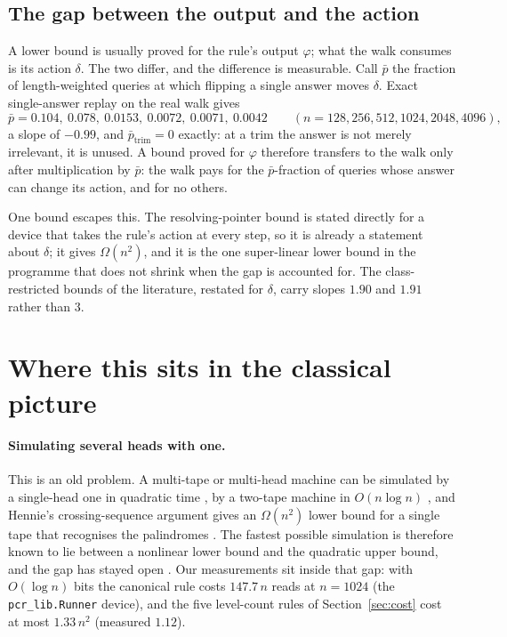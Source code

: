 \documentclass[11pt]{article}
\theoremstyle{remark}
\begin{document}
\subsection{The gap between the output and the action}\label{sec:gap}

A lower bound is usually proved for the rule's output $\varphi$; what the walk consumes is its
action $\delta$. The two differ, and the difference is measurable. Call $\bar p$ the fraction of
length-weighted queries at which flipping a single answer moves $\delta$. Exact single-answer replay
on the real walk gives
\[
\bar p=0.104,\ 0.078,\ 0.0153,\ 0.0072,\ 0.0071,\ 0.0042
\qquad (n=128,256,512,1024,2048,4096),
\]
a slope of $-0.99$, and $\bar p_{\mathrm{trim}}=0$ exactly: at a trim the answer is not merely
irrelevant, it is unused. A bound proved for $\varphi$ therefore transfers to the walk only after
multiplication by $\bar p$: the walk pays for the $\bar p$-fraction of queries whose answer can
change its action, and for no others.

One bound escapes this. The resolving-pointer bound is stated directly for a device that takes the
rule's action at every step, so it is already a statement about $\delta$; it gives $\Omega(n^{2})$,
and it is the one super-linear lower bound in the programme that does not shrink when the gap is
accounted for. The class-restricted bounds of the literature, restated for $\delta$, carry slopes
$1.90$ and $1.91$ rather than $3$.

\section{Where this sits in the classical picture}\label{sec:related}

\paragraph{Simulating several heads with one.} This is an old problem. A multi-tape or multi-head
machine can be simulated by a single-head one in quadratic time \citep{hartmanis-stearns1965}, by a
two-tape machine in $O(n\log n)$ \citep{hennie-stearns1966}, and Hennie's crossing-sequence
argument gives an $\Omega(n^2)$ lower bound for a single tape that recognises the palindromes
\citep{hennie1965}. The fastest possible simulation is therefore known to lie between a nonlinear lower
bound and the quadratic upper bound, and the gap has stayed open \citep{kutrib2010}. Our
measurements sit inside that gap: with $O(\log n)$ bits the canonical rule costs $147.7\,n$ reads at $n=1024$ (the \texttt{pcr\_lib.Runner} device), and the
five level-count rules of Section~\ref{sec:cost} cost at most $1.33\,n^2$ (measured $1.12$).
\end{document}
